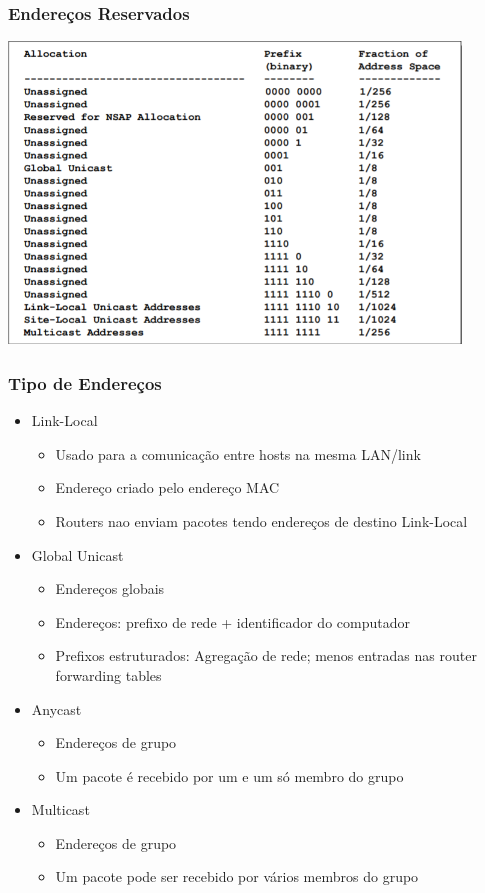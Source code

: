 \documentclass[../resumosRCOM.tex]{subfiles}
\begin{document}
\subsubsection{Endereços Reservados}
\begin{center}
    \includegraphics[width=12cm]{images/RCOM35.png}
\end{center}

\subsubsection{Tipo de Endereços}
\begin{itemize}
    \item Link-Local
    \begin{itemize}
        \item Usado para a comunicação entre hosts na mesma LAN/link
        \item Endereço criado pelo endereço MAC
        \item Routers nao enviam pacotes tendo endereços de destino Link-Local
    \end{itemize}
    \item Global Unicast
    \begin{itemize}
        \item Endereços globais
        \item Endereços: prefixo de rede + identificador do computador
        \item Prefixos estruturados: Agregação de rede; menos entradas nas router forwarding tables
    \end{itemize}
    \item Anycast
    \begin{itemize}
        \item Endereços de grupo
        \item Um pacote é recebido por um e um só membro do grupo
    \end{itemize}
    \item Multicast
    \begin{itemize}
        \item Endereços de grupo
        \item Um pacote pode ser recebido por vários membros do grupo
    \end{itemize}
\end{itemize}
\end{document}
